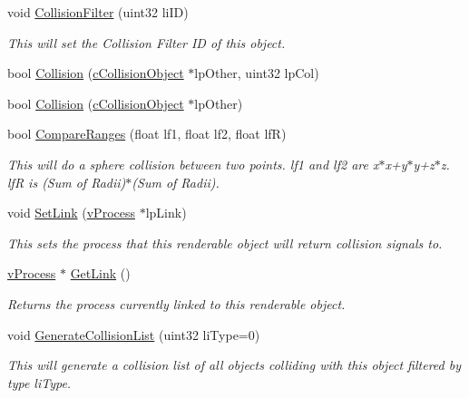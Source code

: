 \begin{DoxyCompactItemize}
void \hyperlink{classc_collision_object_a2a527f445a899adafbf18dddf140e179}{CollisionFilter} (uint32 liID)
\begin{DoxyCompactList}\small\item\em This will set the Collision Filter ID of this object. \item\end{DoxyCompactList}\item 
bool \hyperlink{classc_collision_object_ae9f62c64221d8cc347010fed3cf6e8d1}{Collision} (\hyperlink{classc_collision_object}{cCollisionObject} $\ast$lpOther, uint32 lpCol)
\item 
bool \hyperlink{classc_collision_object_abf62376a5806d878b5810acfd40bc450}{Collision} (\hyperlink{classc_collision_object}{cCollisionObject} $\ast$lpOther)
\item 
bool \hyperlink{classc_collision_object_acc8e58a747eba8e5c7903c8d769b9b31}{CompareRanges} (float lf1, float lf2, float lfR)
\begin{DoxyCompactList}\small\item\em This will do a sphere collision between two points. lf1 and lf2 are x$\ast$x+y$\ast$y+z$\ast$z. lfR is (Sum of Radii)$\ast$(Sum of Radii). \item\end{DoxyCompactList}\item 
void \hyperlink{classc_collision_object_a30475084c3b15f9bf8dc8818ed486c7d}{SetLink} (\hyperlink{classv_process}{vProcess} $\ast$lpLink)
\begin{DoxyCompactList}\small\item\em This sets the process that this renderable object will return collision signals to. \item\end{DoxyCompactList}\item 
\hyperlink{classv_process}{vProcess} $\ast$ \hyperlink{classc_collision_object_a7b501c8848f32131eb36b1f7f69c21ec}{GetLink} ()
\begin{DoxyCompactList}\small\item\em Returns the process currently linked to this renderable object. \item\end{DoxyCompactList}\item 
void \hyperlink{classc_collision_object_a40afa697b7e09e716b471725e6e33805}{GenerateCollisionList} (uint32 liType=0)
\begin{DoxyCompactList}\small\item\em This will generate a collision list of all objects colliding with this object filtered by type liType. \item\end{DoxyCompactList}\item 

\end{DoxyCompactItemize}
